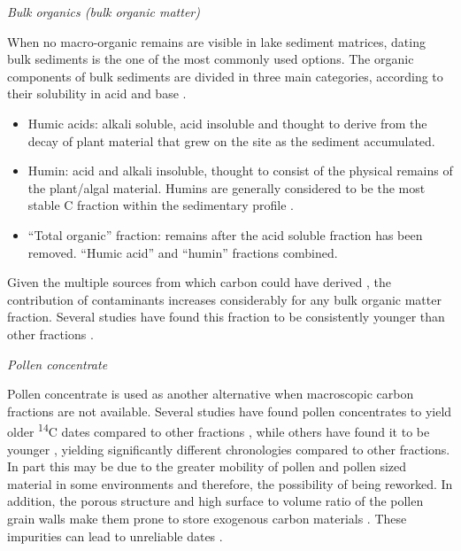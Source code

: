 \documentclass[
  12pt,
]{book}
\providecommand{\tightlist}{%
  \setlength{\itemsep}{0pt}\setlength{\parskip}{0pt}}
\begin{document}
\emph{Bulk organics (bulk organic matter)}

When no macro-organic remains are visible in lake sediment matrices, dating bulk sediments is the one of the most commonly used options. The organic components of bulk sediments are divided in three main categories, according to their solubility in acid and base \citep{vanderplichtRadiocarbonDatingSoil2019, baylissRollingOutRevolution2009}.

\begin{itemize}
\tightlist
\item
  Humic acids: alkali soluble, acid insoluble and thought to derive from the decay of plant material that grew on the site as the sediment accumulated.
\item
  Humin: acid and alkali insoluble, thought to consist of the physical remains of the plant/algal material. Humins are generally considered to be the most stable C fraction within the sedimentary profile \citep{pessendaRadiocarbonDatingTotal2001}.
\item
  ``Total organic'' fraction: remains after the acid soluble fraction has been removed. ``Humic acid'' and ``humin'' fractions combined.
\end{itemize}

Given the multiple sources from which carbon could have derived \citep{bronkramseyRadiocarbonDatingRevolutions2008}, the contribution of contaminants increases considerably for any bulk organic matter fraction. Several studies have found this fraction to be consistently younger than other fractions \citep{wangRadiocarbonDatingSoil1996, pessendaRadiocarbonDatingTotal2001}.

\emph{Pollen concentrate}

Pollen concentrate is used as another alternative when macroscopic carbon fractions are not available. Several studies have found pollen concentrates to yield older \textsuperscript{14}C dates compared to other fractions \citep{neuliebPotentialPitfallsPollen2013, fletcherAMSRadiocarbonDating2017}, while others have found it to be younger \citep{mayEstablishingChronologicalFramework2018}, yielding significantly different chronologies compared to other fractions. In part this may be due to the greater mobility of pollen and pollen sized material in some environments \citep{clymoUpwashDownwashPollen1987} and therefore, the possibility of being reworked. In addition, the porous structure and high surface to volume ratio of the pollen grain walls make them prone to store exogenous carbon materials \citep{kilianProblematic14CAMSDates2002a}. These impurities can lead to unreliable dates \citep{fletcherAMSRadiocarbonDating2017}.
\end{document}
